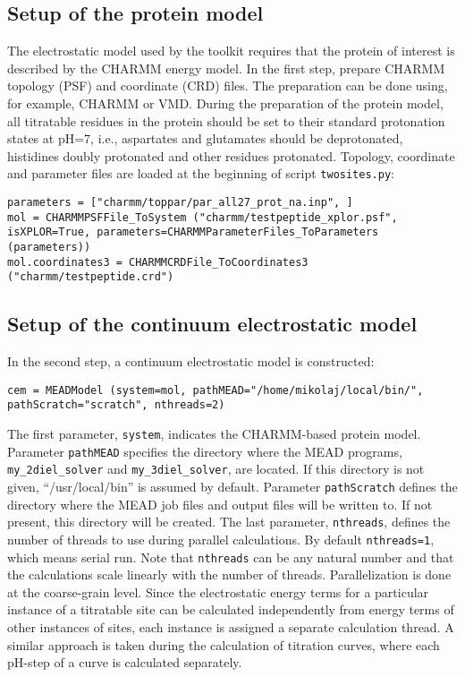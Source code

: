 \documentclass[12pt]{article}
\begin{document}
{\subsection{Setup of the protein model}
The electrostatic model used by the toolkit requires that the protein
of interest is described by the CHARMM energy model\cite{MacKerell1998}.
%
In the first step,
prepare CHARMM topology (PSF) and coordinate (CRD) files.
%
The preparation can be done using,
for example,
CHARMM\cite{CHARMM_Brooks1983} or VMD\cite{VMD1996}.
%
During the preparation of the protein model,
all titratable residues in the protein
should be set to their standard protonation states at pH=7,
i.e.,
aspartates and glutamates should be deprotonated, histidines doubly protonated
and other residues protonated.
%
Topology, coordinate and parameter files are loaded at the
beginning of script \texttt{twosites.py}:

{\footnotesize \singlespacing \begin{lstlisting}
parameters = ["charmm/toppar/par_all27_prot_na.inp", ]
mol = CHARMMPSFFile_ToSystem ("charmm/testpeptide_xplor.psf", isXPLOR=True, parameters=CHARMMParameterFiles_ToParameters (parameters))
mol.coordinates3 = CHARMMCRDFile_ToCoordinates3 ("charmm/testpeptide.crd")
\end{lstlisting} }


\subsection{Setup of the continuum electrostatic model}
%
In the second step, a continuum electrostatic model is constructed:

{\footnotesize \singlespacing \begin{lstlisting}
cem = MEADModel (system=mol, pathMEAD="/home/mikolaj/local/bin/", pathScratch="scratch", nthreads=2)
\end{lstlisting} }

\bigskip
%
The first parameter, {\tt system},
indicates the CHARMM-based protein model.
%
Parameter {\tt pathMEAD} specifies the directory where the MEAD programs,
{\tt my\_2diel\_solver} and {\tt my\_3diel\_solver}, are located.
%
If this directory is not given,
``/usr/local/bin'' is assumed
by default.
%
Parameter {\tt pathScratch} defines the directory where the MEAD job files
and output files will be written to.
%
If not present,
this directory will be created.
%
The last parameter,
{\tt nthreads},
defines the number of threads to use during parallel calculations.
%
By default {\tt nthreads=1}, which means serial run.
%
Note that {\tt nthreads} can be any natural number and that the calculations
scale linearly with the number of threads.
%
Parallelization is done at the coarse-grain level.
%
Since the electrostatic energy terms for a particular instance of a titratable
site can be calculated independently from energy terms of other instances of
sites, each instance is assigned a separate calculation thread.
%
A similar approach is taken during the calculation of titration curves,
where each pH-step of a curve is calculated separately.


}
\end{document}
